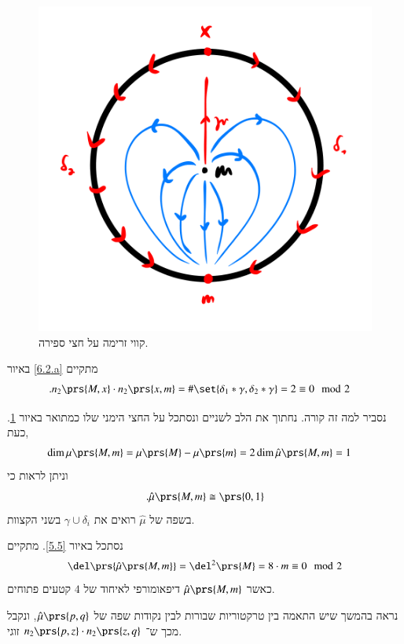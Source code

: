 \documentclass[a4paper,10pt,twoside,openany]{book}
\begin{document}
\begin{figure}
\centering
\includegraphics[scale=0.5]{sources/6.2.b}
\caption{קווי זרימה על חצי ספירה.}
\label{6.2.b}
\end{figure}

\begin{example}
באיור
\ref{6.2.a}
מתקיים
\begin{align*}
\text{.} n_2\prs{M,x} \cdot n_2\prs{x,m} &= \#\set{\delta_1 * \gamma, \delta_2 * \gamma} = 2 \equiv 0 \mod{2}
\end{align*}

נסביר למה זה קורה. נחתוך את הלב לשניים ונסתכל על החצי הימני שלו כמתואר באיור
\ref{6.2.b}.
כעת,
\begin{align*}
\dim \mu\prs{M,m} &= \mu\prs{M} - \mu\prs{m} = 2
\dim \hat{\mu}\prs{M,m} = 1
\end{align*}
וניתן לראות כי
\[\text{.} \hat{\mu}\prs{M,m} \cong \prs{0,1}\]
בשפה של
$\hat{\mu}$
רואים את
$\gamma \cup \delta_i$
בשני הקצוות.
\end{example}

\begin{example}
נסתכל באיור
\ref{5.5}.
מתקיים
\[\del\prs{\hat{\mu}\prs{M,m}} = \del^2\prs{M} = 8 \cdot m \equiv 0 \mod{2}\]
כאשר
$\hat{\mu}\prs{M,m}$
דיפאומורפי לאיחוד של
$4$
קטעים פתוחים.

נראה בהמשך שיש התאמה בין טרקטוריות שבורות לבין נקודות שפה של
$\hat{\mu}\prs{p,q}$,
ונקבל מכך ש־%
$n_2\prs{p,z} \cdot n_2\prs{z,q}$
זוגי.
\end{example}
\end{document}
